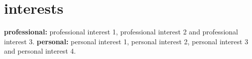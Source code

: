 \documentclass[]{cv-style}          %
\begin{document}

\section{interests}
\vspace{-0.2cm}

\textbf{professional:} professional interest 1, professional interest 2 and professional interest 3. \textbf{personal:} personal interest 1, personal interest 2, personal interest 3 and personal interest 4.

\end{document}
